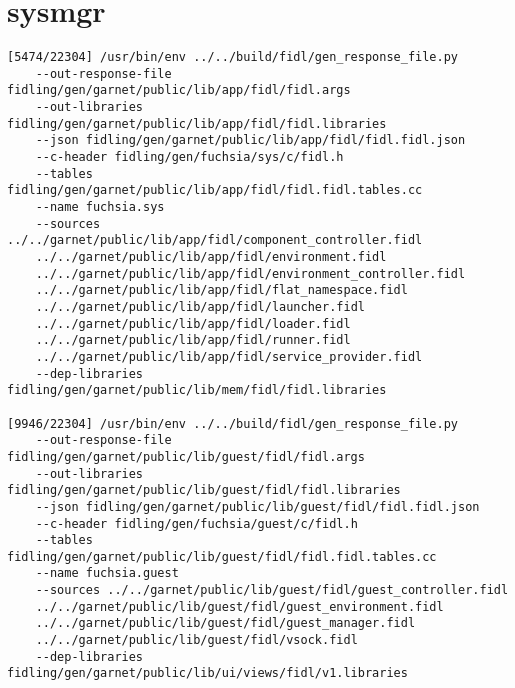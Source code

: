 \section{sysmgr}

\begin{verbatim}
[5474/22304] /usr/bin/env ../../build/fidl/gen_response_file.py 
    --out-response-file fidling/gen/garnet/public/lib/app/fidl/fidl.args 
    --out-libraries fidling/gen/garnet/public/lib/app/fidl/fidl.libraries 
    --json fidling/gen/garnet/public/lib/app/fidl/fidl.fidl.json 
    --c-header fidling/gen/fuchsia/sys/c/fidl.h 
    --tables fidling/gen/garnet/public/lib/app/fidl/fidl.fidl.tables.cc 
    --name fuchsia.sys 
    --sources ../../garnet/public/lib/app/fidl/component_controller.fidl 
    ../../garnet/public/lib/app/fidl/environment.fidl 
    ../../garnet/public/lib/app/fidl/environment_controller.fidl 
    ../../garnet/public/lib/app/fidl/flat_namespace.fidl 
    ../../garnet/public/lib/app/fidl/launcher.fidl 
    ../../garnet/public/lib/app/fidl/loader.fidl 
    ../../garnet/public/lib/app/fidl/runner.fidl 
    ../../garnet/public/lib/app/fidl/service_provider.fidl 
    --dep-libraries fidling/gen/garnet/public/lib/mem/fidl/fidl.libraries

[9946/22304] /usr/bin/env ../../build/fidl/gen_response_file.py 
    --out-response-file fidling/gen/garnet/public/lib/guest/fidl/fidl.args 
    --out-libraries fidling/gen/garnet/public/lib/guest/fidl/fidl.libraries 
    --json fidling/gen/garnet/public/lib/guest/fidl/fidl.fidl.json 
    --c-header fidling/gen/fuchsia/guest/c/fidl.h 
    --tables fidling/gen/garnet/public/lib/guest/fidl/fidl.fidl.tables.cc 
    --name fuchsia.guest 
    --sources ../../garnet/public/lib/guest/fidl/guest_controller.fidl 
    ../../garnet/public/lib/guest/fidl/guest_environment.fidl 
    ../../garnet/public/lib/guest/fidl/guest_manager.fidl 
    ../../garnet/public/lib/guest/fidl/vsock.fidl 
    --dep-libraries fidling/gen/garnet/public/lib/ui/views/fidl/v1.libraries


\end{verbatim}


